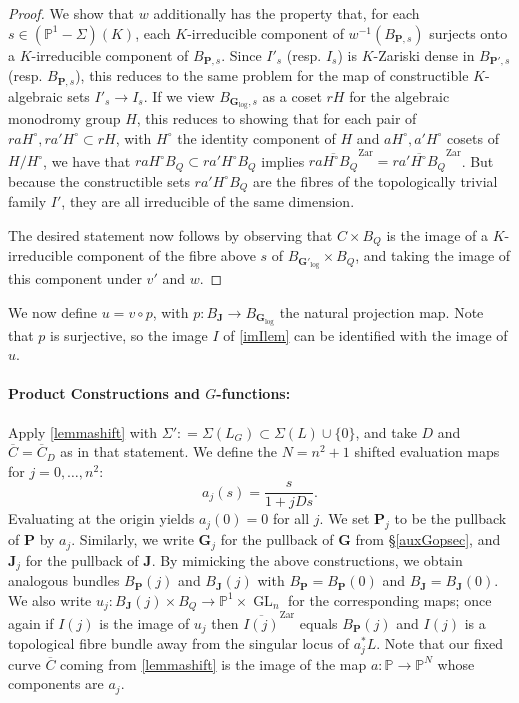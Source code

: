 \documentclass[10pt]{article}
\numberwithin{equation}{section}
\theoremstyle{plain}
\theoremstyle{definition}
\theoremstyle{remark}
\newcommand{\GL}{\operatorname{GL}}
\newcommand{\PP}{\mathbb{P}}
\begin{document}
\begin{proof}
We show that $w$ additionally has the property that, for each $s \in (\mathbb{P}^1 - \Sigma)(K)$, each $K$-irreducible component of $w^{-1}(B_{\mathbf{P},s})$ surjects onto a $K$-irreducible component of $B_{\mathbf{P},s}$. Since $I'_{s}$ (resp. $I_{s}$) is $K$-Zariski dense in $B_{\mathbf{P}',s}$ (resp. $B_{\mathbf{P},s}$), this reduces to the same problem for the map of constructible $K$-algebraic sets $I'_{s} \to I_{s}$. If we view $B_{\mathbf{G}_{\operatorname{log}},s}$ as a coset $r H$ for the algebraic monodromy group $H$, this reduces to showing that for each pair of $r a H^{\circ}, r a' H^{\circ} \subset r H$, with $H^{\circ}$ the identity component of $H$ and $a H^{\circ}, a' H^{\circ}$ cosets of $H/H^{\circ}$, we have that $r a H^{\circ} B_{Q} \subset r a' H^{\circ} B_{Q}$ implies $\overline{r a H^{\circ} B_{Q}}^{\textrm{Zar}} = \overline{r a' H^{\circ} B_{Q}}^{\textrm{Zar}}$. But because the constructible sets $r a' H^{\circ} B_{Q}$ are the fibres of the topologically trivial family $I'$, they are all irreducible of the same dimension.

The desired statement now follows by observing that $C \times B_{Q}$ is the image of a $K$-irreducible component of the fibre above $s$ of $B_{\mathbf{G}'_{\operatorname{log}}} \times B_{Q}$, and taking the image of this component under $v'$ and $w$. 
\end{proof}
\noindent We now define $u = v \circ p$, with $p : B_{\mathbf{J}} \to B_{\mathbf{G}_{\operatorname{log}}}$ the natural projection map. Note that $p$ is surjective, so the image $I$ of \autoref{imIlem} can be identified with the image of $u$.


\paragraph{Product Constructions and $G$-functions:} Apply \autoref{lemmashift} with $\Sigma': = \Sigma (L_G) \subset \Sigma(L) \cup \{ 0 \}$, and take $D$ and $\overline{C} = \overline{C}_{D}$ as in that statement. We define the $N = n^2 + 1$ shifted evaluation maps for $j = 0, \dots, n^2$:
\[ a_j(s) = \frac{s}{1 + jDs} . \]
Evaluating at the origin yields $a_j(0) = 0$ for all $j$. We set $\mathbf{P}_{j}$ to be the pullback of $\mathbf{P}$ by $a_j$. Similarly, we write $\mathbf{G}_{j}$ for the pullback of $\mathbf{G}$ from \S\ref{auxGopsec}, and $\mathbf{J}_j$ for the pullback of $\mathbf{J}$. By mimicking the above constructions, we obtain analogous bundles $B_{\mathbf{P}}(j)$ and $B_{\mathbf{J}}(j)$ with $B_{\mathbf{P}} = B_{\mathbf{P}}(0)$ and $B_{\mathbf{J}} = B_{\mathbf{J}}(0)$. We also write $u_{j} : B_{\mathbf{J}}(j) \times B_{Q} \to \mathbb{P}^1 \times \GL_{n}$ for the corresponding maps; once again if $I(j)$ is the image of $u_{j}$ then $\overline{I(j)}^{\operatorname{Zar}}$ equals $B_{\mathbf{P}}(j)$ and $I(j)$ is a topological fibre bundle away from the singular locus of $a^{*}_{j} L$. Note that our fixed curve $\overline{C}$ coming from \autoref{lemmashift} is the image of the map $a : \PP \to \PP^{N}$ whose components are $a_{j}$.
\end{document}
